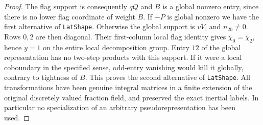 \begin{proof}
The flag support is consequently $qQ$ and $B$ is a
global nonzero entry, since there is no lower flag
coordinate of weight $B$. If $-P$ is global nonzero
we have the first alternative of \texttt{LatShape}.
Otherwise the global support is $vV$, and $n_{20}\ne0$.
Rows $0,2$ are then diagonal. Their first-column local
flag identity gives $\bar\chi_0=\bar\chi_2$, hence $y=1$
on the entire local decomposition group. Entry $12$
of the global representation has no two-step products
with this support. If it were a local coboundary in the
specified sense, odd-entry vanishing would kill it globally,
contrary to tightness of $B$. This proves the second
alternative of \texttt{LatShape}. All transformations
have been genuine integral matrices in a finite extension
of the original discretely valued fraction field, and
preserved the exact inertial labels. In particular no
specialization of an arbitrary pseudorepresentation has
been used.
\end{proof}

